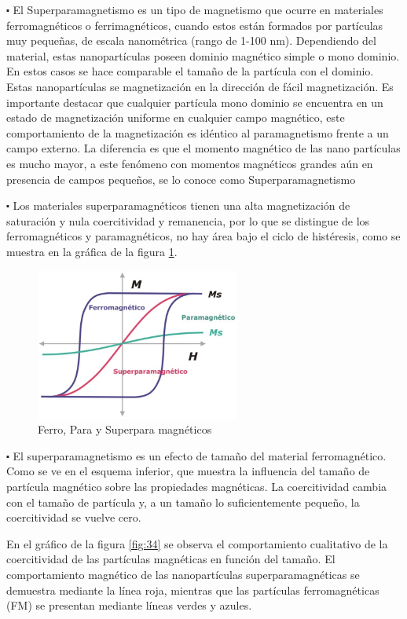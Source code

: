 $\centerdot$ El Superparamagnetismo es un tipo de magnetismo que ocurre en materiales ferromagnéticos o ferrimagnéticos, cuando estos están formados por partículas muy pequeñas, de escala nanométrica (rango de 1-100 nm). Dependiendo del material, estas nanopartículas poseen dominio magnético simple o mono dominio. En estos casos se hace comparable el tamaño de la partícula con el dominio. Estas nanopartículas se magnetización en la dirección de fácil magnetización. Es importante destacar que cualquier partícula mono dominio se encuentra en un estado de magnetización uniforme en cualquier campo magnético, este comportamiento de la magnetización es idéntico al paramagnetismo frente a un campo externo. La diferencia es que el momento magnético de las nano partículas es mucho mayor, a este fenómeno con momentos magnéticos grandes aún en presencia de campos pequeños, se lo conoce como Superparamagnetismo

$\centerdot$ Los materiales superparamagnéticos tienen una alta magnetización de saturación y nula coercitividad y remanencia, por lo que se distingue de los ferromagnéticos y paramagnéticos, no hay área bajo el ciclo de histéresis, como se muestra en la gráfica de la figura \ref{fig:33}.

\begin{figure}[H]
    \centering
    \includegraphics[width=0.6\textwidth]{./Figures/fig33}
	\caption{Ferro, Para y Superpara magnéticos}
	\label{fig:33}    
\end{figure}

$\centerdot$ El superparamagnetismo es un efecto de tamaño del material ferromagnético. Como se ve en el esquema inferior, que muestra la influencia del tamaño de partícula magnético sobre las propiedades magnéticas. La coercitividad cambia con el tamaño de partícula y, a un tamaño lo suficientemente pequeño, la coercitividad se vuelve cero.

En el gráfico de la figura \ref{fig:34} se observa el comportamiento cualitativo de la coercitividad de las partículas magnéticas en función del tamaño. El comportamiento magnético de las nanopartículas superparamagnéticas se demuestra mediante la línea roja, mientras que las partículas ferromagnéticas (FM) se presentan mediante líneas verdes y azules.


